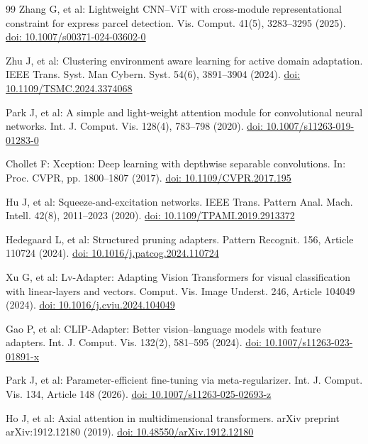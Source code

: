 \documentclass[pdflatex,sn-mathphys-num]{sn-jnl}
\theoremstyle{thmstyleone}
\theoremstyle{thmstyletwo}
\theoremstyle{thmstylethree}
\begin{document}
\begin{thebibliography}{99}
Zhang G, et al:
Lightweight CNN--ViT with cross-module representational constraint for express parcel detection.
Vis. Comput. 41(5), 3283--3295 (2025).
\href{https://doi.org/10.1007/s00371-024-03602-0}{doi: 10.1007/s00371-024-03602-0}

Zhu J, et al:
Clustering environment aware learning for active domain adaptation.
IEEE Trans. Syst. Man Cybern. Syst. 54(6), 3891--3904 (2024).
\href{https://doi.org/10.1109/TSMC.2024.3374068}{doi: 10.1109/TSMC.2024.3374068}

Park J, et al:
A simple and light-weight attention module for convolutional neural networks.
Int. J. Comput. Vis. 128(4), 783--798 (2020).
\href{https://doi.org/10.1007/s11263-019-01283-0}{doi: 10.1007/s11263-019-01283-0}

Chollet F:
Xception: Deep learning with depthwise separable convolutions.
In: Proc. CVPR, pp. 1800--1807 (2017).
\href{https://doi.org/10.1109/CVPR.2017.195}{doi: 10.1109/CVPR.2017.195}

Hu J, et al:
Squeeze-and-excitation networks.
IEEE Trans. Pattern Anal. Mach. Intell. 42(8), 2011--2023 (2020).
\href{https://doi.org/10.1109/TPAMI.2019.2913372}{doi: 10.1109/TPAMI.2019.2913372}

Hedegaard L, et al:
Structured pruning adapters.
Pattern Recognit. 156, Article 110724 (2024).
\href{https://doi.org/10.1016/j.patcog.2024.110724}{doi: 10.1016/j.patcog.2024.110724}

Xu G, et al:
Lv-Adapter: Adapting Vision Transformers for visual classification with linear-layers and vectors.
Comput. Vis. Image Underst. 246, Article 104049 (2024).
\href{https://doi.org/10.1016/j.cviu.2024.104049}{doi: 10.1016/j.cviu.2024.104049}

Gao P, et al:
CLIP-Adapter: Better vision--language models with feature adapters.
Int. J. Comput. Vis. 132(2), 581--595 (2024).
\href{https://doi.org/10.1007/s11263-023-01891-x}{doi: 10.1007/s11263-023-01891-x}

Park J, et al:
Parameter-efficient fine-tuning via meta-regularizer.
Int. J. Comput. Vis. 134, Article 148 (2026).
\href{https://doi.org/10.1007/s11263-025-02693-z}{doi: 10.1007/s11263-025-02693-z}

Ho J, et al:
Axial attention in multidimensional transformers.
arXiv preprint arXiv:1912.12180 (2019).
\href{https://doi.org/10.48550/arXiv.1912.12180}{doi: 10.48550/arXiv.1912.12180}


\end{thebibliography}
\end{document}

